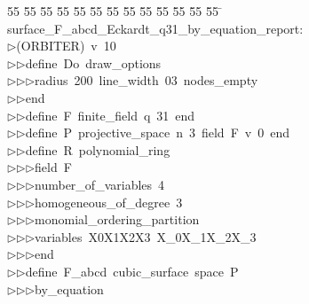 %
%
\begin{tabbing}
55 \= 55 \= 55 \= 55 \= 55 \= 55 \= 55 \= 55 \= 55 \= 55 \= 55 \= 55 \= 55 \= \kill
surface\_F\_abcd\_Eckardt\_q31\_by\_equation\_report:\\[0pt]
$\triangleright$\>(ORBITER)\ v\ 10\ \\[0pt]
$\triangleright$\>$\triangleright$\>define\ Do\ draw\_options\ \\[0pt]
$\triangleright$\>$\triangleright$\>$\triangleright$\>radius\ 200\ line\_width\ 03\ nodes\_empty\ \\[0pt]
$\triangleright$\>$\triangleright$\>end\ \\[0pt]
$\triangleright$\>$\triangleright$\>define\ F\ finite\_field\ q\ 31\ end\ \\[0pt]
$\triangleright$\>$\triangleright$\>define\ P\ projective\_space\ n\ 3\ field\ F\ v\ 0\ end\ \\[0pt]
$\triangleright$\>$\triangleright$\>define\ R\ polynomial\_ring\ \\[0pt]
$\triangleright$\>$\triangleright$\>$\triangleright$\>field\ F\ \\[0pt]
$\triangleright$\>$\triangleright$\>$\triangleright$\>number\_of\_variables\ 4\ \\[0pt]
$\triangleright$\>$\triangleright$\>$\triangleright$\>homogeneous\_of\_degree\ 3\ \\[0pt]
$\triangleright$\>$\triangleright$\>$\triangleright$\>monomial\_ordering\_partition\ \\[0pt]
$\triangleright$\>$\triangleright$\>$\triangleright$\>variables\ X0X1X2X3\ X\_0X\_1X\_2X\_3\ \\[0pt]
$\triangleright$\>$\triangleright$\>$\triangleright$\>end\ \\[0pt]
$\triangleright$\>$\triangleright$\>define\ F\_abcd\ cubic\_surface\ space\ P\ \\[0pt]
$\triangleright$\>$\triangleright$\>$\triangleright$\>by\_equation\ \\[0pt]

\end{tabbing}
